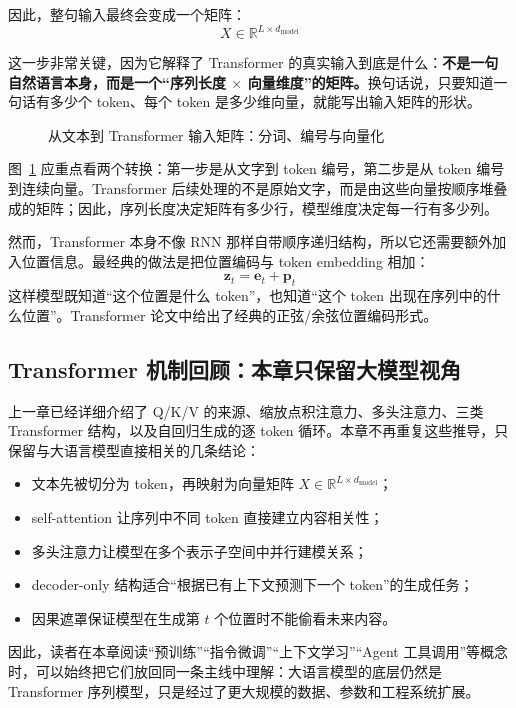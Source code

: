 因此，整句输入最终会变成一个矩阵：
\[
X \in \mathbb{R}^{L \times d_{\text{model}}}
\]

这一步非常关键，因为它解释了 Transformer 的真实输入到底是什么：\textbf{不是一句自然语言本身，而是一个“序列长度 $\times$ 向量维度”的矩阵。}换句话说，只要知道一句话有多少个 token、每个 token 是多少维向量，就能写出输入矩阵的形状。

\begin{figure}[H]
  \centering
  \resizebox{\textwidth}{!}{}
  \caption{从文本到 Transformer 输入矩阵：分词、编号与向量化}
  \label{fig:ch11_orig1}
\end{figure}

图~\ref{fig:ch11_orig1} 应重点看两个转换：第一步是从文字到 token 编号，第二步是从 token 编号到连续向量。Transformer 后续处理的不是原始文字，而是由这些向量按顺序堆叠成的矩阵；因此，序列长度决定矩阵有多少行，模型维度决定每一行有多少列。

然而，Transformer 本身不像 RNN 那样自带顺序递归结构，所以它还需要额外加入位置信息。最经典的做法是把位置编码与 token embedding 相加：
\[
\mathbf{z}_t = \mathbf{e}_t + \mathbf{p}_t
\]
这样模型既知道“这个位置是什么 token”，也知道“这个 token 出现在序列中的什么位置”。Transformer 论文中给出了经典的正弦/余弦位置编码形式。

\subsection{Transformer 机制回顾：本章只保留大模型视角}

上一章已经详细介绍了 Q/K/V 的来源、缩放点积注意力、多头注意力、三类 Transformer 结构，以及自回归生成的逐 token 循环。本章不再重复这些推导，只保留与大语言模型直接相关的几条结论：

\begin{itemize}
    \item 文本先被切分为 token，再映射为向量矩阵 \(X\in\mathbb{R}^{L\times d_{\text{model}}}\)；
    \item self-attention 让序列中不同 token 直接建立内容相关性；
    \item 多头注意力让模型在多个表示子空间中并行建模关系；
    \item decoder-only 结构适合“根据已有上下文预测下一个 token”的生成任务；
    \item 因果遮罩保证模型在生成第 \(t\) 个位置时不能偷看未来内容。
\end{itemize}

因此，读者在本章阅读“预训练”“指令微调”“上下文学习”“Agent 工具调用”等概念时，可以始终把它们放回同一条主线中理解：大语言模型的底层仍然是 Transformer 序列模型，只是经过了更大规模的数据、参数和工程系统扩展。

